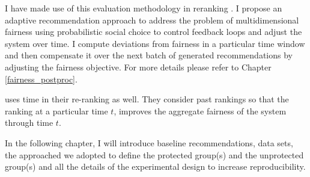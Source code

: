     I have made use of this evaluation methodology in reranking \cite{sonboli2020dynm}. I propose an adaptive recommendation approach to address the problem of multidimensional fairness using probabilistic social choice to control feedback loops and adjust the system over time. I compute deviations from fairness in a particular time window and then compensate it over the next batch of generated recommendations by adjusting the fairness objective. For more details please refer to Chapter \ref{fairness_postproc}.

    \cite{biega2018equity} uses time in their re-ranking as well. They consider past rankings so that the ranking at a particular time $t$, improves the aggregate fairness of the system through time $t$.
    
    
    In the following chapter, I will introduce baseline recommendations, data sets, the approached we adopted to define the protected group(s) and the unprotected group(s) and all the details of the experimental design to increase reproducibility.